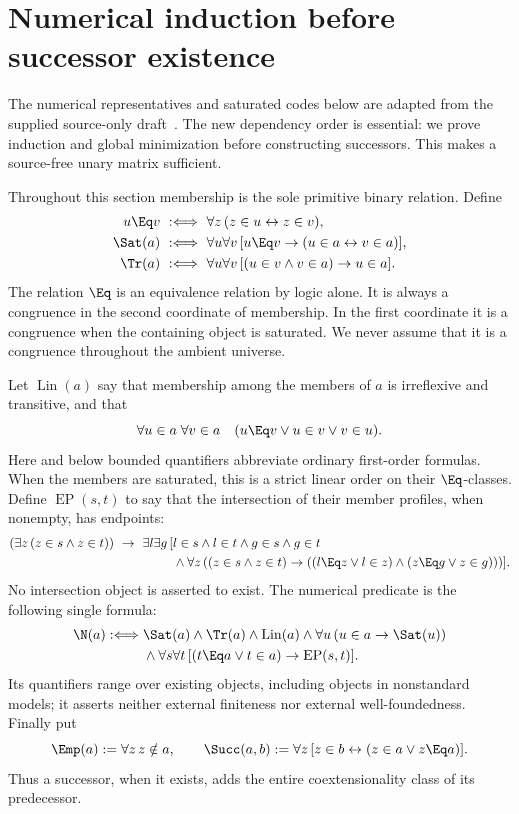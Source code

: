 \section{Numerical induction before successor existence}\label{un:core}

The numerical representatives and saturated codes below are adapted from
the supplied source-only draft~\cite{draftC2}. The new dependency order is
essential: we prove induction and global minimization before constructing
successors. This makes a source-free unary matrix sufficient.

Throughout this section membership is the sole primitive binary relation.
Define
\begin{align*}
 u\Eq v&\ :\Longleftrightarrow\ \forall z\,(z\in u\leftrightarrow z\in v),\\
 \Sat(a)&\ :\Longleftrightarrow\ \forall u\forall v\,
 [u\Eq v\to(u\in a\leftrightarrow v\in a)],\\
 \Tr(a)&\ :\Longleftrightarrow\ \forall u\forall v\,
 [(u\in v\land v\in a)\to u\in a].
\end{align*}
The relation $\Eq$ is an equivalence relation by logic alone. It is always
a congruence in the second coordinate of membership. In the first
coordinate it is a congruence when the containing object is saturated.
We never assume that it is a congruence throughout the ambient universe.

Let $\operatorname{Lin}(a)$ say that membership among the members of $a$
is irreflexive and transitive, and that
\[
 \forall u\in a\;\forall v\in a\quad
       (u\Eq v\lor u\in v\lor v\in u).
\]
Here and below bounded quantifiers abbreviate ordinary first-order
formulas. When the members are saturated, this is a strict linear order
on their $\Eq$-classes. Define $\operatorname{EP}(s,t)$ to say that the
intersection of their member profiles, when nonempty, has endpoints:
\[
\begin{split}
 (\exists z\,(z\in s\land z\in t))\ \to\
 \exists l\exists g\,[&
 l\in s\land l\in t\land g\in s\land g\in t\\
 &\land\forall z\,((z\in s\land z\in t)\to
       ((l\Eq z\lor l\in z)\land(z\Eq g\lor z\in g)))].
\end{split}
\]
No intersection object is asserted to exist. The numerical predicate is
the following single formula:
\begin{equation}\label{un:number-definition}
\begin{split}
 \N(a):\Longleftrightarrow{}&
 \Sat(a)\land\Tr(a)\land\operatorname{Lin}(a)
 \land\forall u\,(u\in a\to\Sat(u))\\
 &\land\forall s\forall t\,
       [(t\Eq a\lor t\in a)\to\operatorname{EP}(s,t)].
\end{split}
\end{equation}
Its quantifiers range over existing objects, including objects in
nonstandard models; it asserts neither external finiteness nor external
well-foundedness. Finally put
\[
 \Emp(a):=\forall z\,z\notin a,\qquad
 \Succ(a,b):=\forall z\,[z\in b\leftrightarrow
                             (z\in a\lor z\Eq a)].
\]
Thus a successor, when it exists, adds the entire coextensionality class
of its predecessor.

